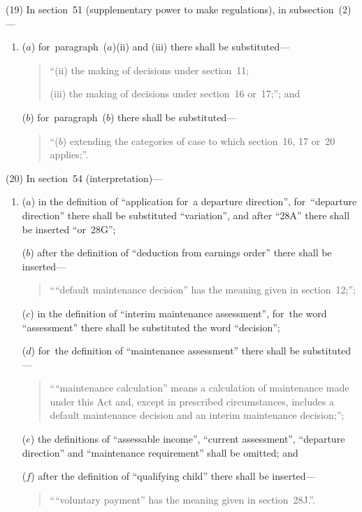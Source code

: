 \documentclass[12pt,a4paper]{article}
\begin{document}
(19) In section~51 (supplementary power to make regulations), in subsection~(2)—
\begin{enumerate}\item[]
($a$) for~paragraph~($a$)(ii)  and (iii)  there shall be substituted—
\begin{quotation}
“(ii) the making of decisions under section~11;

(iii) the making of decisions under section~16 or~17;”; and
\end{quotation}

($b$) for~paragraph~($b$)  there shall be substituted—
\begin{quotation}
“($b$) extending the categories of case to which section~16, 17 or~20 applies;”.
\end{quotation}
\end{enumerate}

(20) In section~54 (interpretation)—
\begin{enumerate}\item[]
($a$) in the definition of “application for~a departure direction”, for~“departure direction” there shall be substituted “variation”, and after “28A” there shall be inserted “or~28G”;

($b$) after the definition of “deduction from earnings order” there shall be inserted—
\begin{quotation}
““default maintenance decision” has the meaning given in section~12;”;
\end{quotation}

($c$) in the definition of “interim maintenance assessment”, for~the word “assessment” there shall be substituted the word “decision”;

($d$) for~the definition of “maintenance assessment” there shall be substituted—
\begin{quotation}
““maintenance calculation” means a calculation of maintenance made under this Act and, except in prescribed circumstances, includes a default maintenance decision and an interim maintenance decision;”;
\end{quotation}

($e$) the definitions of “assessable income”, “current assessment”, “departure direction” and “maintenance requirement” shall be omitted; and

($f$) after the definition of “qualifying child” there shall be inserted—
\begin{quotation}
\begin{sloppypar}
““voluntary payment” has the meaning given in section~28J.”.
\end{sloppypar}
\end{quotation}
\end{enumerate}
\end{document}
